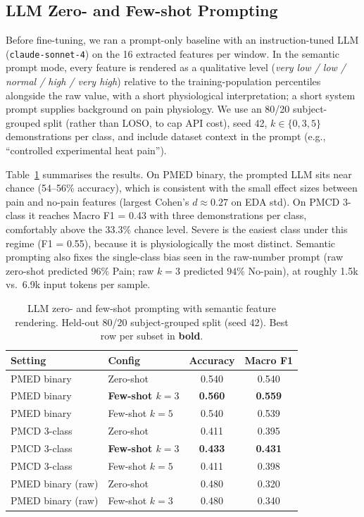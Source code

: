 \documentclass{article}
\begin{document}
\subsection{LLM Zero- and Few-shot Prompting}
\label{sec:llm_zeroshot}

Before fine-tuning, we ran a prompt-only baseline with an instruction-tuned LLM (\texttt{claude-sonnet-4}) on the 16 extracted features per window. In the semantic prompt mode, every feature is rendered as a qualitative level (\emph{very low / low / normal / high / very high}) relative to the training-population percentiles alongside the raw value, with a short physiological interpretation; a short system prompt supplies background on pain physiology. We use an 80/20 subject-grouped split (rather than LOSO, to cap API cost), seed 42, $k \in \{0, 3, 5\}$ demonstrations per class, and include dataset context in the prompt (e.g., ``controlled experimental heat pain'').

Table~\ref{tab:llm_zeroshot} summarises the results. On PMED binary, the prompted LLM sits near chance (54--56\% accuracy), which is consistent with the small effect sizes between pain and no-pain features (largest Cohen's $d \approx 0.27$ on EDA std). On PMCD 3-class it reaches Macro F1 = 0.43 with three demonstrations per class, comfortably above the 33.3\% chance level. Severe is the easiest class under this regime (F1 = 0.55), because it is physiologically the most distinct. Semantic prompting also fixes the single-class bias seen in the raw-number prompt (raw zero-shot predicted $96\%$ Pain; raw $k=3$ predicted $94\%$ No-pain), at roughly 1.5k vs.\ 6.9k input tokens per sample.

\begin{table}[t]
\centering
\caption{LLM zero- and few-shot prompting with semantic feature rendering. Held-out 80/20 subject-grouped split (seed 42). Best row per subset in \textbf{bold}.}
\label{tab:llm_zeroshot}
\small
\begin{tabular}{@{}llcc@{}}
\toprule
\textbf{Setting} & \textbf{Config} & \textbf{Accuracy} & \textbf{Macro F1} \\
\midrule
PMED binary       & Zero-shot        & 0.540 & 0.540 \\
PMED binary       & \textbf{Few-shot $k{=}3$} & \textbf{0.560} & \textbf{0.559} \\
PMED binary       & Few-shot $k{=}5$ & 0.540 & 0.539 \\
\midrule
PMCD 3-class      & Zero-shot        & 0.411 & 0.395 \\
PMCD 3-class      & \textbf{Few-shot $k{=}3$} & \textbf{0.433} & \textbf{0.431} \\
PMCD 3-class      & Few-shot $k{=}5$ & 0.411 & 0.398 \\
\midrule
PMED binary (raw) & Zero-shot        & 0.480 & 0.320 \\
PMED binary (raw) & Few-shot $k{=}3$ & 0.480 & 0.340 \\
\bottomrule
\end{tabular}
\end{table}
\end{document}
